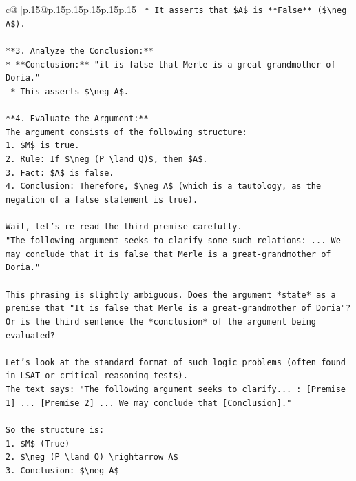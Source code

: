 \documentclass{article}
\begin{document}
{\begin{supertabular}{c@{$\;$}|p{.15\linewidth}@{}p{.15\linewidth}p{.15\linewidth}p{.15\linewidth}p{.15\linewidth}p{.15\linewidth}}
{{{\texttt{    *   It asserts that \$A\$ is **False** (\$\textbackslash{}neg A\$).} \\
\\ 
\texttt{**3. Analyze the Conclusion:**} \\
\texttt{*   **Conclusion:** "it is false that Merle is a great{-}grandmother of Doria."} \\
\texttt{    *   This asserts \$\textbackslash{}neg A\$.} \\
\\ 
\texttt{**4. Evaluate the Argument:**} \\
\texttt{The argument consists of the following structure:} \\
\texttt{1.  \$M\$ is true.} \\
\texttt{2.  Rule: If \$\textbackslash{}neg (P \textbackslash{}land Q)\$, then \$A\$.} \\
\texttt{3.  Fact: \$A\$ is false.} \\
\texttt{4.  Conclusion: Therefore, \$\textbackslash{}neg A\$ (which is a tautology, as the negation of a false statement is true).} \\
\\ 
\texttt{Wait, let's re{-}read the third premise carefully.} \\
\texttt{"The following argument seeks to clarify some such relations: ... We may conclude that it is false that Merle is a great{-}grandmother of Doria."} \\
\\ 
\texttt{This phrasing is slightly ambiguous. Does the argument *state* as a premise that "It is false that Merle is a great{-}grandmother of Doria"? Or is the third sentence the *conclusion* of the argument being evaluated?} \\
\\ 
\texttt{Let's look at the standard format of such logic problems (often found in LSAT or critical reasoning tests).} \\
\texttt{The text says: "The following argument seeks to clarify... : {[}Premise 1{]} ... {[}Premise 2{]} ... We may conclude that {[}Conclusion{]}."} \\
\\ 
\texttt{So the structure is:} \\
\texttt{1.  \$M\$ (True)} \\
\texttt{2.  \$\textbackslash{}neg (P \textbackslash{}land Q) \textbackslash{}rightarrow A\$} \\
\texttt{3.  Conclusion: \$\textbackslash{}neg A\$} \\
}}}
\end{supertabular}}
\end{document}
